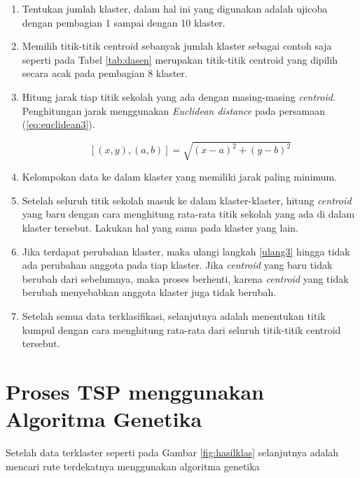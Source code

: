 \begin{enumerate}
	\item Tentukan jumlah klaster, dalam hal ini yang digunakan adalah ujicoba dengan pembagian 1 sampai dengan 10 klaster.
	\item Memilih titik-titik centroid sebanyak jumlah klaster sebagai contoh saja seperti pada Tabel \ref{tab:dasen} merupakan titik-titik centroid yang dipilih secara acak pada pembagian 8 klaster.
	


	\item \label{ulang3} Hitung jarak tiap titik sekolah yang ada dengan masing-masing \textit{centroid}. Penghitungan jarak menggunakan \textit{Euclidean distance} pada persamaan (\ref{eq:euclidean3}).
	
	\begin{equation}
	\left[ \left( x,y \right) ,\left( a,b \right)\right]=\sqrt{\left( x-a \right)^{2}+\left( y-b \right)^{2}}
	\label{eq:euclidean3}
	\end{equation}	
	
	\item Kelompokan data ke dalam klaster yang memiliki jarak paling minimum.
	\item Setelah seluruh titik sekolah masuk ke dalam klaster-klaster, hitung \textit{centroid} yang baru dengan cara menghitung rata-rata titik sekolah yang ada di dalam klaster tersebut. Lakukan hal yang sama pada klaster yang lain.
	\item Jika terdapat perubahan klaster, maka ulangi langkah \ref{ulang3} hingga tidak ada perubahan anggota pada tiap klaster. Jika \textit{centroid} yang baru tidak berubah dari sebelumnya, maka proses berhenti, karena \textit{centroid} yang tidak berubah menyebabkan anggota klaster juga tidak berubah.
	
	\item Setelah semua data terklasifikasi, selanjutnya adalah menentukan titik kumpul dengan cara menghitung rata-rata dari seluruh titik-titik centroid tersebut.
\end{enumerate}

\section{Proses TSP menggunakan Algoritma Genetika}

Setelah data terklaster seperti pada Gambar \ref{fig:hasilklas} selanjutnya adalah mencari rute terdekatnya menggunakan algoritma genetika


